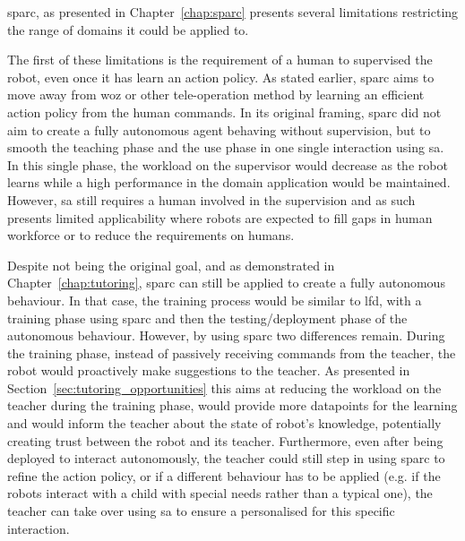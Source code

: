 \gls{sparc}, as presented in Chapter~\ref{chap:sparc} presents several limitations restricting the range of domains it could be applied to.

The first of these limitations is the requirement of a human to supervised the robot, even once it has learn an action policy. As stated earlier, \gls{sparc} aims to move away from \gls{woz} or other tele-operation method by learning an efficient action policy from the human commands. In its original framing, \gls{sparc} did not aim to create a fully autonomous agent behaving without supervision, but to smooth the teaching phase and the use phase in one single interaction using \gls{sa}. In this single phase, the workload on the supervisor would decrease as the robot learns while a high performance in the domain application would be maintained. However, \gls{sa} still requires a human involved in the supervision and as such presents limited applicability where robots are expected to fill gaps in human workforce or to reduce the requirements on humans. 

Despite not being the original goal, and as demonstrated in Chapter~\ref{chap:tutoring}, \gls{sparc} can still be applied to create a fully autonomous behaviour. In that case, the training process would be similar to \gls{lfd}, with a training phase using \gls{sparc} and then the testing/deployment phase of the autonomous behaviour. However, by using \gls{sparc} two differences remain. During the training phase, instead of passively receiving commands from the teacher, the robot would proactively make suggestions to the teacher. As presented in Section~\ref{sec:tutoring_opportunities} this aims at reducing the workload on the teacher during the training phase, would provide more datapoints for the learning and would inform the teacher about the state of robot's knowledge, potentially creating trust between the robot and its teacher. Furthermore, even after being deployed to interact autonomously, the teacher could still step in using \gls{sparc} to refine the action policy, or if a different behaviour has to be applied (e.g. if the robots interact with a child with special needs rather than a typical one), the teacher can take over using \gls{sa} to ensure a personalised for this specific interaction.

